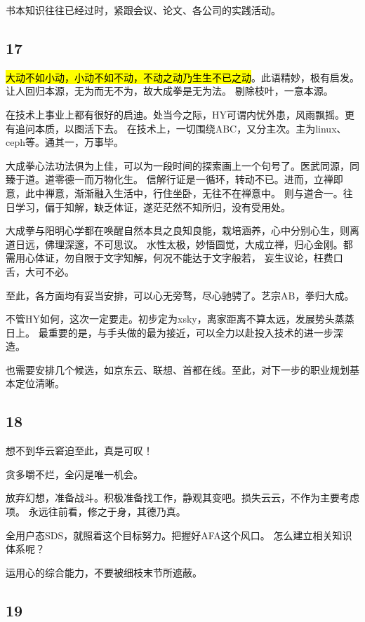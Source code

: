 书本知识往往已经过时，紧跟会议、论文、各公司的实践活动。

\subsection{17}

\hl{大动不如小动，小动不如不动，不动之动乃生生不已之动}。此语精妙，极有启发。让人回归本源，无为而无不为，故大成拳是无为法。
剔除枝叶，一意本源。

在技术上事业上都有很好的启迪。处当今之际，HY可谓内忧外患，风雨飘摇。更有追问本质，以图活下去。
在技术上，一切围绕ABC，又分主次。主为linux、ceph等。通其一，万事毕。

大成拳心法功法俱为上佳，可以为一段时间的探索画上一个句号了。医武同源，同臻于道。道零德一而万物化生。
信解行证是一循环，转动不已。进而，立禅即意，此中禅意，渐渐融入生活中，行住坐卧，无往不在禅意中。
则与道合一。往日学习，偏于知解，缺乏体证，遂茫茫然不知所归，没有受用处。

大成拳与阳明心学都在唤醒自然本具之良知良能，栽培涵养，心中分别心生，则离道日远，佛理深邃，不可思议。
水性太极，妙悟圆觉，大成立禅，归心金刚。都需用心体证，勿自限于文字知解，何况不能达于文字般若，
妄生议论，枉费口舌，大可不必。

至此，各方面均有妥当安排，可以心无旁骛，尽心驰骋了。艺宗AB，拳归大成。

不管HY如何，这次一定要走。初步定为xsky，离家距离不算太远，发展势头蒸蒸日上。
最重要的是，与手头做的最为接近，可以全力以赴投入技术的进一步深造。

也需要安排几个候选，如京东云、联想、首都在线。至此，对下一步的职业规划基本定位清晰。

\subsection{18}

想不到华云窘迫至此，真是可叹！

贪多嚼不烂，全闪是唯一机会。

放弃幻想，准备战斗。积极准备找工作，静观其变吧。损失云云，不作为主要考虑项。
永远往前看，修之于身，其德乃真。

全用户态SDS，就照着这个目标努力。把握好AFA这个风口。
怎么建立相关知识体系呢？

运用心的综合能力，不要被细枝末节所遮蔽。

\subsection{19}

